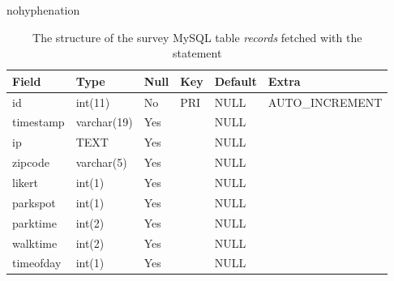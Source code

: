 \begin{hyphenrules}{nohyphenation}
    \begin{table}[H]
        \centering
        \setlength\tabcolsep{1.2ex}
        \caption[Structure of MySQL table records]{The structure of the survey MySQL table \textit{records} fetched with the statement } 
        \label{tab:mysql_records_str}
        \begin{tabular}{ @{} >{\raggedright\arraybackslash}p{2cm} >{\raggedright\arraybackslash}p{2cm} >{\raggedright\arraybackslash}p{1cm} >{\raggedright\arraybackslash}p{1cm} >{\raggedright\arraybackslash}p{1.5cm} >{\raggedleft\arraybackslash}p{4cm} @{} }
            \toprule
            Field & Type & Null & Key & Default & Extra \\
            \midrule
            id & int(11) & No & PRI & NULL & AUTO\_INCREMENT \\
            timestamp & varchar(19) & Yes & & NULL & \\
            ip & TEXT & Yes & & NULL & \\
            zipcode & varchar(5) & Yes & & NULL & \\
            likert & int(1) & Yes & & NULL & \\
            parkspot & int(1) & Yes & & NULL & \\
            parktime & int(2) & Yes & & NULL & \\
            walktime & int(2) & Yes & & NULL & \\
            timeofday & int(1) & Yes & & NULL & \\
            \bottomrule
        \end{tabular}
    \end{table} 
\end{hyphenrules}

